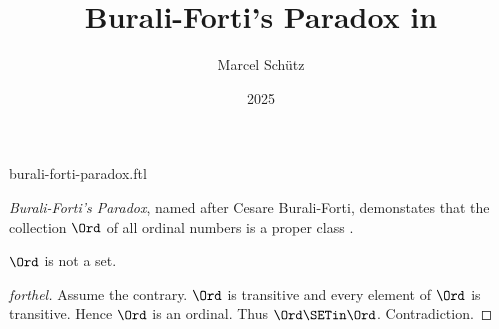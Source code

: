 \documentclass{stex}
\title{Burali-Forti's Paradox in \Naproche}
\author{Marcel Schütz}
\date{2025}
\begin{document}
\begin{smodule}{burali-forti-paradox.ftl}
\maketitle


\noindent \emph{Burali-Forti's Paradox}, named after Cesare Burali-Forti, 
demonstates that the collection $\Ord$ of all ordinal numbers is a
proper class \cite{BuraliForti1897}.

\begin{theorem}[forthel,title=Burali-Forti's Paradox,id=burali_forti_paradox]
  $\Ord$ is not a set.
\end{theorem}
\begin{proof}[forthel]
  Assume the contrary.
  $\Ord$ is transitive and every element of $\Ord$ is transitive.
  Hence $\Ord$ is an ordinal.
  Thus $\Ord \SETin \Ord$.
  Contradiction.
\end{proof}

\printbibliography
{}
\end{smodule}
\end{document}
